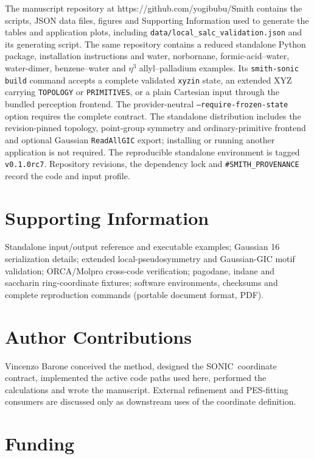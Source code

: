 \documentclass[journal=jctcce,manuscript=article,layout=traditional]{achemso}
\providecommand{\url}[1]{#1}
\newcommand{\SONIC}{SONIC}
\theoremstyle{definition}
\begin{document}
The manuscript repository at
\url{https://github.com/yogibubu/Smith} contains the scripts, JSON data files,
figures and Supporting Information used to generate the tables and application
plots, including \texttt{data/local\_salc\_validation.json} and its generating
script.  The same repository contains a reduced standalone Python package,
installation instructions and water, norbornane, formic-acid--water,
water-dimer, benzene--water and $\eta^3$ allyl--palladium examples.  Its
\texttt{smith-sonic build} command accepts a complete validated \texttt{xyzin}
state, an extended XYZ carrying \texttt{TOPOLOGY} or \texttt{PRIMITIVES}, or a
plain Cartesian input through the bundled perception frontend.  The provider-neutral
\texttt{--require-frozen-state} option requires the complete contract.  The
standalone distribution includes the revision-pinned topology, point-group
symmetry and ordinary-primitive frontend and
optional Gaussian \texttt{ReadAllGIC} export; installing or running another
application is not required.  The reproducible standalone environment is tagged
\texttt{v0.1.0rc7}. Repository revisions, the dependency lock and
\texttt{\#SMITH\_PROVENANCE} record the code and input profile.

\section*{Supporting Information}

Standalone input/output reference and executable examples; Gaussian 16
serialization details; extended local-pseudosymmetry and Gaussian-GIC motif
validation; ORCA/Molpro cross-code verification; pagodane, indane and saccharin
ring-coordinate fixtures; software environments, checksums and complete
reproduction commands (portable document format, PDF).

\section*{Author Contributions}

Vincenzo Barone conceived the method, designed the \SONIC\ coordinate
contract, implemented the active code paths used here, performed the
calculations and wrote the manuscript.  External refinement and PES-fitting
consumers are discussed only as downstream uses of the coordinate definition.

\section*{Funding}
\end{document}
